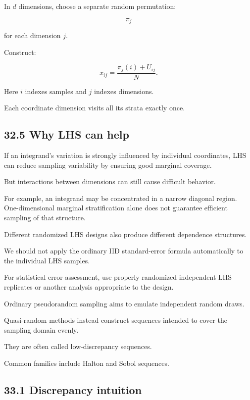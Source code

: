 \hypertarget{02-foundations-ii-ch031-higher-dimensional-construction}{}

In \(d\) dimensions, choose a separate random permutation:

\[ \pi_j \]

for each dimension \(j\).

Construct:

\[ \boxed{ x_{ij}= \frac{\pi_j(i)+U_{ij}}N }. \]

Here \(i\) indexes samples and \(j\) indexes dimensions.

Each coordinate dimension visits all its strata exactly once.

\subsection{32.5 Why LHS can help}\label{02-foundations-ii-ch031-why-lhs-can-help}

\hypertarget{02-foundations-ii-ch031-why-lhs-can-help}{}

If an integrand's variation is strongly influenced by individual coordinates, LHS can reduce sampling variability by ensuring good marginal coverage.

But interactions between dimensions can still cause difficult behavior.

For example, an integrand may be concentrated in a narrow diagonal region. One-dimensional marginal stratification alone does not guarantee efficient sampling of that structure.

Different randomized LHS designs also produce different dependence structures.

We should not apply the ordinary IID standard-error formula automatically to the individual LHS samples.

For statistical error assessment, use properly randomized independent LHS replicates or another analysis appropriate to the design.

Ordinary pseudorandom sampling aims to emulate independent random draws.

Quasi-random methods instead construct sequences intended to cover the sampling domain evenly.

They are often called low-discrepancy sequences.

Common families include Halton and Sobol sequences.

\subsection{33.1 Discrepancy intuition}\label{02-foundations-ii-ch031-discrepancy-intuition}

